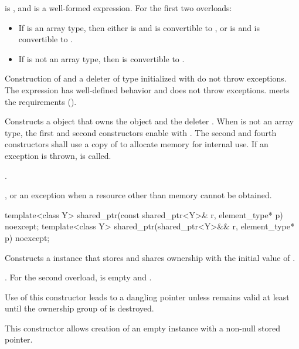 \begin{itemdescr}
\pnum
\constraints
{} is , and
 is a well-formed expression.
For the first two overloads:
\begin{itemize}
\item
If  is an array type, then either
 is  and  is convertible to , or
 is  and  is convertible to .

\item
If  is not an array type, then  is convertible to .
\end{itemize}

\pnum
\expects
Construction of  and a deleter of type 
initialized with  do not throw exceptions.
The expression 
has well-defined behavior and does not throw exceptions.
 meets the  requirements ().

\pnum
\effects
Constructs a  object that owns the
object  and the deleter .
When  is not an array type,
the first and second constructors enable  with .
The second and fourth constructors shall use a copy of  to
allocate memory for internal use.
If an exception is thrown,  is called.

\pnum
\ensures
{}.

\pnum
\throws
{}, or an  exception
when a resource other than memory cannot be obtained.
\end{itemdescr}

%
\begin{itemdecl}
template<class Y> shared_ptr(const shared_ptr<Y>& r, element_type* p) noexcept;
template<class Y> shared_ptr(shared_ptr<Y>&& r, element_type* p) noexcept;
\end{itemdecl}

\begin{itemdescr}
\pnum
\effects
Constructs a  instance that
stores  and shares ownership with
the initial value of .

\pnum
\ensures
{}.
For the second overload,
 is empty and .

\pnum
\begin{note}
Use of this constructor leads to a dangling pointer
unless  remains valid
at least until the ownership group of  is destroyed.
\end{note}

\pnum
\begin{note}
This constructor allows creation of an empty
 instance with a non-null stored pointer.
\end{note}
\end{itemdescr}


